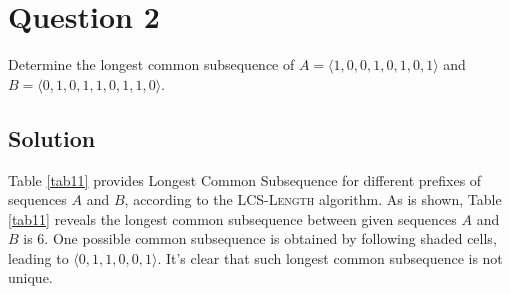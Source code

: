 
\section*{Question 2}

Determine the longest common subsequence of $A = \langle 1, 0, 0, 1, 0, 1, 0, 1 \rangle$ and $B = \langle 0, 1, 0, 1, 1, 0, 1, 1, 0 \rangle$.

\subsection*{Solution}

Table \ref{tab11} provides Longest Common Subsequence for different prefixes of sequences $A$ and $B$, according to the \textsc{LCS-Length} algorithm.
As is shown, Table \ref{tab11} reveals the longest common subsequence between given sequences $A$ and $B$ is 6.
One possible common subsequence is obtained by following shaded cells, leading to $\langle 0, 1, 1, 0, 0, 1 \rangle$.
It's clear that such longest common subsequence is not unique.

